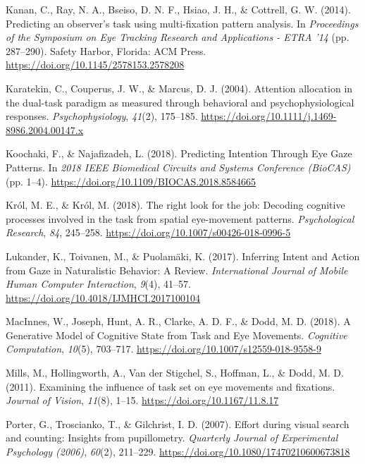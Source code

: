 \documentclass[
  english,
  man, donotrepeattitle,floatsintext]{apa6}
\begin{document}
\leavevmode\hypertarget{ref-kananPredictingObserverTask2014a}{}%
Kanan, C., Ray, N. A., Bseiso, D. N. F., Hsiao, J. H., \& Cottrell, G. W. (2014). Predicting an observer's task using multi-fixation pattern analysis. In \emph{Proceedings of the Symposium on Eye Tracking Research and Applications - ETRA '14} (pp. 287--290). Safety Harbor, Florida: ACM Press. \url{https://doi.org/10.1145/2578153.2578208}

\leavevmode\hypertarget{ref-karatekinAttentionAllocationDualtask2004}{}%
Karatekin, C., Couperus, J. W., \& Marcus, D. J. (2004). Attention allocation in the dual-task paradigm as measured through behavioral and psychophysiological responses. \emph{Psychophysiology}, \emph{41}(2), 175--185. \url{https://doi.org/10.1111/j.1469-8986.2004.00147.x}

\leavevmode\hypertarget{ref-koochakiPredictingIntentionEye2018a}{}%
Koochaki, F., \& Najafizadeh, L. (2018). Predicting Intention Through Eye Gaze Patterns. In \emph{2018 IEEE Biomedical Circuits and Systems Conference (BioCAS)} (pp. 1--4). \url{https://doi.org/10.1109/BIOCAS.2018.8584665}

\leavevmode\hypertarget{ref-krolRightLookJob2018a}{}%
Król, M. E., \& Król, M. (2018). The right look for the job: Decoding cognitive processes involved in the task from spatial eye-movement patterns. \emph{Psychological Research}, \emph{84}, 245--258. \url{https://doi.org/10.1007/s00426-018-0996-5}

\leavevmode\hypertarget{ref-lukanderInferringIntentAction2017c}{}%
Lukander, K., Toivanen, M., \& Puolamäki, K. (2017). Inferring Intent and Action from Gaze in Naturalistic Behavior: A Review. \emph{International Journal of Mobile Human Computer Interaction}, \emph{9}(4), 41--57. \url{https://doi.org/10.4018/IJMHCI.2017100104}

\leavevmode\hypertarget{ref-macinnesjosephGenerativeModelCognitive2018a}{}%
MacInnes, W., Joseph, Hunt, A. R., Clarke, A. D. F., \& Dodd, M. D. (2018). A Generative Model of Cognitive State from Task and Eye Movements. \emph{Cognitive Computation}, \emph{10}(5), 703--717. \url{https://doi.org/10.1007/s12559-018-9558-9}

\leavevmode\hypertarget{ref-millsExaminingInfluenceTask2011a}{}%
Mills, M., Hollingworth, A., Van der Stigchel, S., Hoffman, L., \& Dodd, M. D. (2011). Examining the influence of task set on eye movements and fixations. \emph{Journal of Vision}, \emph{11}(8), 1--15. \url{https://doi.org/10.1167/11.8.17}

\leavevmode\hypertarget{ref-porterEffortVisualSearch2007}{}%
Porter, G., Troscianko, T., \& Gilchrist, I. D. (2007). Effort during visual search and counting: Insights from pupillometry. \emph{Quarterly Journal of Experimental Psychology (2006)}, \emph{60}(2), 211--229. \url{https://doi.org/10.1080/17470210600673818}
\end{document}
